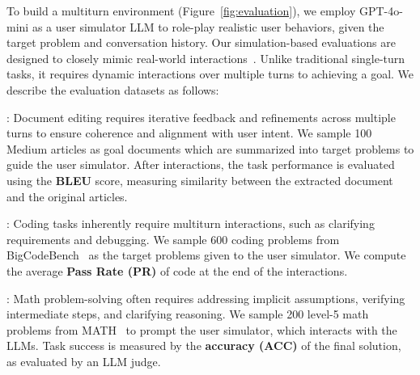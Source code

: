To build a multiturn environment (Figure~\ref{fig:evaluation}), we employ GPT-4o-mini as a user simulator LLM to role-play realistic user behaviors, given the target problem and conversation history. Our simulation-based evaluations are designed to closely mimic real-world interactions~\cite{simulate1000}. 
Unlike traditional single-turn tasks, it requires dynamic interactions over multiple turns to achieving a goal. 
We describe the evaluation datasets as follows: 

\noindent \textbf{\doct}: Document editing requires iterative feedback and refinements across multiple turns to ensure coherence and alignment with user intent. We sample 100 Medium articles as goal documents which are summarized into target problems to guide the user simulator. After interactions, the task performance is evaluated using the \textbf{BLEU} score, measuring similarity between the extracted document and the original articles.

\noindent \textbf{\codet}: Coding tasks inherently require multiturn interactions, such as clarifying requirements and debugging. We sample 600 coding problems from BigCodeBench~\citep{bigcodebench} as the target problems given to the user simulator. We compute the average \textbf{Pass Rate (PR)} of code at the end of the interactions.

\noindent \textbf{\mathct}: Math problem-solving often requires addressing implicit assumptions, verifying intermediate steps, and clarifying reasoning. We sample 200 level-5 math problems from MATH~\citep{math} to prompt the user simulator, which interacts with the LLMs. Task success is measured by the \textbf{accuracy (ACC)} of the final solution, as evaluated by an LLM judge.

